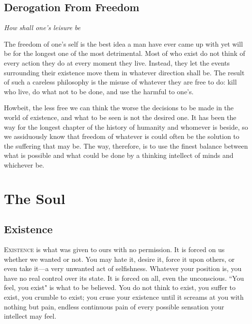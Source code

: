 \documentclass[oneside]{book}
\begin{document}
\section{Derogation From Freedom}
\textit{How shall one's leisure be}

The freedom of one's self is the best idea a man have ever came up with yet will
be for the longest one of the most detrimental. Most of who exist do not think
of every action they do at every moment they live. Instead, they let the events
surrounding their existence move them in whatever direction shall be. The result
of such a careless philosophy is the misuse of whatever they are free to do:
kill who live, do what not to be done, and use the harmful to one's.

Howbeit, the less free we can think the worse the decisions to be made in the
world of existence, and what to be seen is not the desired one. It has been the
way for the longest chapter of the history of humanity and whomever is beside,
so we assiduously know that freedom of whatever is could often be the solution
to the suffering that may be. The way, therefore, is to use the finest balance
between what is possible and what could be done by a thinking intellect of minds
and whichever be.

\chapter{The Soul}
\section{Existence}

\lettrine{E}{xistence} is what was given to ours with no permission. It is forced
on us whether we wanted or not. You may hate it, desire it, force it upon
others, or even take it—a very unwanted act of selfishness. Whatever your
position is, you have no real control over its state. It is forced on all, even
the unconscious. ``You feel, you exist" is what to be believed. You do not think
to exist, you suffer to exist, you crumble to exist; you cruse your existence
until it screams at you with nothing but pain, endless continuous pain of every
possible sensation your intellect may feel.
\end{document}
